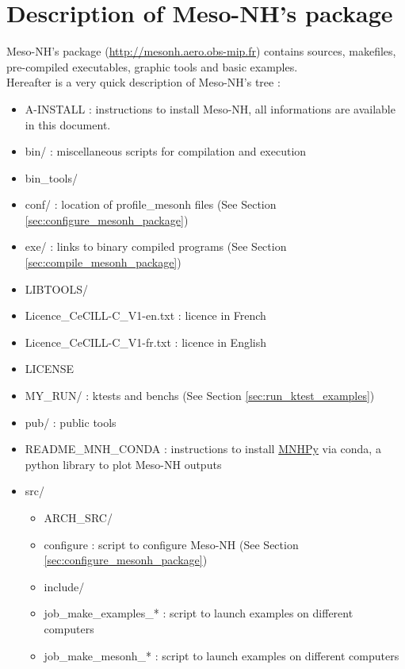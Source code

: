 \section{Description of Meso-NH's package}
\label{sec:description_mesonh_package}

Meso-NH's package (\href{http://mesonh.aero.obs-mip.fr}{http://mesonh.aero.obs-mip.fr}) contains sources, makefiles, pre-compiled executables, graphic tools and basic examples. \\

Hereafter is a very quick description of Meso-NH's tree :
\begin{itemize}
\item A-INSTALL : instructions to install Meso-NH,  all informations are available in this document.
\item bin/ : miscellaneous scripts for compilation and execution
\item bin\_tools/
\item conf/ : location of profile\_mesonh files (See Section \ref{sec:configure_mesonh_package})
\item exe/ : links to binary compiled programs (See Section \ref{sec:compile_mesonh_package})
\item LIBTOOLS/
\item Licence\_CeCILL-C\_V1-en.txt : licence in French
\item Licence\_CeCILL-C\_V1-fr.txt : licence in English
\item LICENSE
\item MY\_RUN/ : ktests and benchs  (See Section \ref{sec:run_ktest_examples})
\item pub/ : public tools
\item README\_MNH\_CONDA : instructions to install \href{https://github.com/QuentinRodier/MNHPy}{MNHPy} via conda, a python library to plot Meso-NH outputs
\item src/
\begin{itemize}
\item ARCH\_SRC/ 
\item configure : script to configure Meso-NH (See Section \ref{sec:configure_mesonh_package})
\item include/
\item job\_make\_examples\_* : script to launch examples on different computers
\item job\_make\_mesonh\_* : script to launch examples on different computers

\end{itemize}
\end{itemize}
